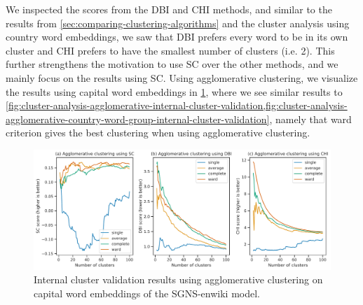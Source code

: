 We inspected the scores from the DBI and CHI methods, and similar to the results from \cref{sec:comparing-clustering-algorithms} and the cluster analysis using country word embeddings, we saw that DBI prefers every word to be in its own cluster and CHI prefers to have the smallest number of clusters (i.e. 2). This further strengthens the motivation to use SC over the other methods, and we mainly focus on the results using SC. Using agglomerative clustering, we visualize the results using capital word embeddings in \cref{fig:cluster-analysis-agglomerative-country-capitals-word-group-internal-cluster-validation}, where we see similar results to \cref{fig:cluster-analysis-agglomerative-internal-cluster-validation,fig:cluster-analysis-agglomerative-country-word-group-internal-cluster-validation}, namely that ward criterion gives the best clustering when using agglomerative clustering.
\begin{figure}[H]
    \centering
    \includegraphics[width=\textwidth]{thesis/figures/cluster-analysis-agglomerative-country-capitals-word-group-internal-cluster-validation.pdf}
    \caption{Internal cluster validation results using agglomerative clustering on capital word embeddings of the SGNS-enwiki model.}
    \label{fig:cluster-analysis-agglomerative-country-capitals-word-group-internal-cluster-validation}
\end{figure}

